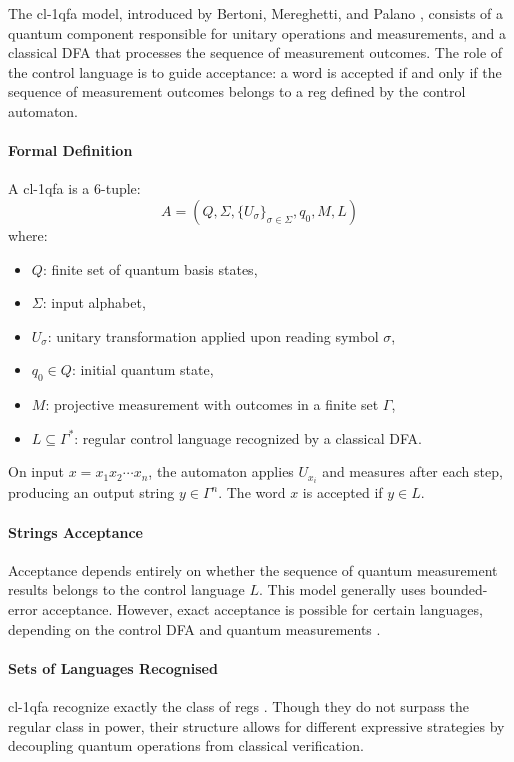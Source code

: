   
The \gls{cl-1qfa} model, introduced by Bertoni, Mereghetti, and Palano \cite{mereghetti2006quantum}, consists of a quantum component responsible for unitary operations and measurements, and a classical DFA that processes the sequence of measurement outcomes. The role of the control language is to guide acceptance: a word is accepted if and only if the sequence of measurement outcomes belongs to a \gls{reg} defined by the control automaton.

\paragraph{Formal Definition}  
A \gls{cl-1qfa} is a 6-tuple:
\[
A = (Q, \Sigma, \{U_\sigma\}_{\sigma \in \Sigma}, q_0, M, L)
\]
where:
\begin{itemize}
    \item $Q$: finite set of quantum basis states,
    \item $\Sigma$: input alphabet,
    \item $U_\sigma$: unitary transformation applied upon reading symbol $\sigma$,
    \item $q_0 \in Q$: initial quantum state,
    \item $M$: projective measurement with outcomes in a finite set $\Gamma$,
    \item $L \subseteq \Gamma^*$: regular control language recognized by a classical DFA.
\end{itemize}
On input $x = x_1x_2\cdots x_n$, the automaton applies $U_{x_i}$ and measures after each step, producing an output string $y \in \Gamma^n$. The word $x$ is accepted if $y \in L$.

\paragraph{Strings Acceptance}  
Acceptance depends entirely on whether the sequence of quantum measurement results belongs to the control language $L$. This model generally uses bounded-error acceptance. However, exact acceptance is possible for certain languages, depending on the control DFA and quantum measurements \cite{mereghetti2006quantum}.

\paragraph{Sets of Languages Recognised}  
\gls{cl-1qfa} recognize exactly the class of \glspl{reg} \cite{li2015hybrid}. Though they do not surpass the regular class in power, their structure allows for different expressive strategies by decoupling quantum operations from classical verification.

